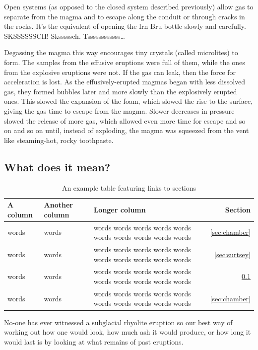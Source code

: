 \documentclass[a4paper,11pt]{article}
\begin{document}
Open systems (as opposed to the closed system described previously) allow gas to separate from the magma and to escape along the conduit or through cracks in the rocks. It's the equivalent of opening the Irn Bru bottle slowly and carefully. SKSSSSSSCH! Sksssssch. Tssssssssssss\ldots

Degassing the magma this way encourages tiny crystals (called microlites) to form. The samples from the effusive eruptions were full of them, while the ones from the explosive eruptions were not. If the gas can leak, then the force for acceleration is lost.  As the  effusively-erupted magmas began with less dissolved gas, they formed bubbles later and more slowly than the explosively erupted ones. This slowed the expansion of the foam, which slowed the rise to the surface, giving the gas time to escape from the magma.  Slower decreases in pressure slowed the release of more gas, which allowed even more time for escape and so on and so on until, instead of exploding, the magma was squeezed from the vent like steaming-hot, rocky toothpaste.

\subsection{What does it mean?}
\label{sec:meaning}

\begin{table}
\caption{An example table featuring links to sections}
\begin{tabular}{|p{3.0cm}p{3.5cm}p{7.0cm}r|}\hline
\textbf{A column} & \textbf{Another column} & \textbf{Longer column} & \textbf{Section} \\
\hline
words & words & words words words words words words words words words words & \ref{sec:chamber} \\
words & words & words words words words words words words words words words & \ref{sec:surtsey} \\
words & words & words words words words words words words words words words & \ref{sec:meaning} \\
words & words & words words words words words words words words words words & \ref{sec:chamber} \\
\hline
\end{tabular}
\label{tab:summary}
\end{table}

No-one has ever witnessed a subglacial rhyolite eruption so our best way of working out how one would look, how much ash it would produce, or how long it would last is by looking at what remains of past eruptions.
\end{document}
